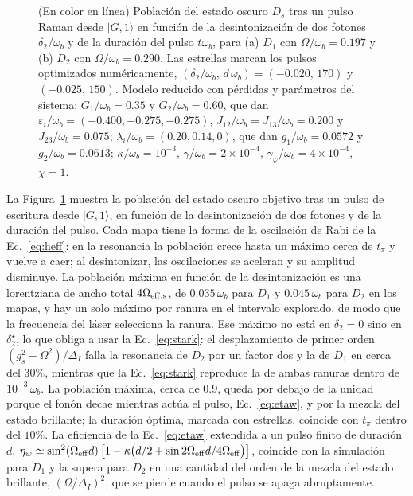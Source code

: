 \documentclass[aps,pra,twocolumn,groupedaddress,amsmath,amssymb,floatfix]{revtex4-2}
\newcommand{\ket}[1]{\lvert #1\rangle}
\begin{document}
\begin{figure}[t]
	\centering
	\resizebox{\columnwidth}{!}{}
	\caption{(En color en l\'inea) Poblaci\'on del estado oscuro $D_s$ tras un pulso Raman desde $\ket{G,1}$ en funci\'on de la desintonizaci\'on de dos fotones $\delta_2/\omega_b$ y de la duraci\'on del pulso $t\omega_b$, para (a) $D_1$ con $\Omega/\omega_b=0.197$ y (b) $D_2$ con $\Omega/\omega_b=0.290$. Las estrellas marcan los pulsos optimizados num\'ericamente, $(\delta_2/\omega_b,\,d\,\omega_b)=(-0.020,\,170)$ y $(-0.025,\,150)$. Modelo reducido con p\'erdidas y par\'ametros del sistema: $G_1/\omega_b=0.35$ y $G_2/\omega_b=0.60$, que dan $\varepsilon_i/\omega_b=(-0.400,-0.275,-0.275)$, $J_{12}/\omega_b=J_{13}/\omega_b=0.200$ y $J_{23}/\omega_b=0.075$; $\lambda_i/\omega_b=(0.20,0.14,0)$, que dan $g_1/\omega_b=0.0572$ y $g_2/\omega_b=0.0613$; $\kappa/\omega_b=10^{-3}$, $\gamma/\omega_b=2\times10^{-4}$, $\gamma_\varphi/\omega_b=4\times10^{-4}$, $\chi=1$.}
	\label{fig:raman_map}
\end{figure}

La Figura~\ref{fig:raman_map} muestra la poblaci\'on del estado oscuro objetivo tras un pulso de escritura desde $\ket{G,1}$, en funci\'on de la desintonizaci\'on de dos fotones y de la duraci\'on del pulso. Cada mapa tiene la forma de la oscilaci\'on de Rabi de la Ec.~\eqref{eq:heff}: en la resonancia la poblaci\'on crece hasta un m\'aximo cerca de $t_\pi$ y vuelve a caer; al desintonizar, las oscilaciones se aceleran y su amplitud disminuye. La poblaci\'on m\'axima en funci\'on de la desintonizaci\'on es una lorentziana de ancho total $4\Omega_{\rm eff,s}$, de $0.035\,\omega_b$ para $D_1$ y $0.045\,\omega_b$ para $D_2$ en los mapas, y hay un solo m\'aximo por ranura en el intervalo explorado, de modo que la frecuencia del l\'aser selecciona la ranura. Ese m\'aximo no est\'a en $\delta_2=0$ sino en $\delta_2^\star$, lo que obliga a usar la Ec.~\eqref{eq:stark}: el desplazamiento de primer orden $(g_s^2-\Omega^2)/\Delta_I$ falla la resonancia de $D_2$ por un factor dos y la de $D_1$ en cerca del $30\%$, mientras que la Ec.~\eqref{eq:stark} reproduce la de ambas ranuras dentro de $10^{-3}\,\omega_b$. La poblaci\'on m\'axima, cerca de $0.9$, queda por debajo de la unidad porque el fon\'on decae mientras act\'ua el pulso, Ec.~\eqref{eq:etaw}, y por la mezcla del estado brillante; la duraci\'on \'optima, marcada con estrellas, coincide con $t_\pi$ dentro del $10\%$. La eficiencia de la Ec.~\eqref{eq:etaw} extendida a un pulso finito de duraci\'on $d$, $\eta_w\simeq\sin^2(\Omega_{\rm eff}d)\,\bigl[1-\kappa\bigl(d/2+\sin 2\Omega_{\rm eff}d/4\Omega_{\rm eff}\bigr)\bigr]$, coincide con la simulaci\'on para $D_1$ y la supera para $D_2$ en una cantidad del orden de la mezcla del estado brillante, $(\Omega/\Delta_I)^2$, que se pierde cuando el pulso se apaga abruptamente.
\end{document}
